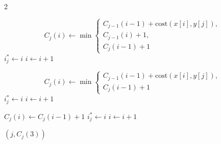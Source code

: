 \begin{multicols}{2}
\begin{algorithmic}
                \State
                \[
                    C_j(i)\gets
                    \min\left\{
                            \begin{array}{l}
                                C_{j-1}(i-1)+\mathrm{cost}(x[i],y[j]),\\
                                C_{j-1}(i)+ 1,\\
                                C_j(i-1)+ 1
                            \end{array}
                    \right.
                \]
                    \State $i_j^\ast \gets i$
                \EndIf
                \State $i \gets i+1$
            \EndWhile

                \State
                \[
                    C_j(i)\gets
                    \min\left\{
                            \begin{array}{l}
                                C_{j-1}(i-1)+\mathrm{cost}(x[i],y[j]),\\
                                C_j(i-1)+ 1
                            \end{array}
                    \right.
                \]
                    \State $i_j^\ast \gets i$
                \EndIf
                \State $i \gets i+1$

                    \State $C_j(i)\gets C_j(i-1)+ 1$
                        \State $i_j^\ast \gets i$
                    \EndIf
                    \State $i \gets i+1$
                \EndWhile
            \EndIf

                \State \Return $(j,C_j(3))$
            \EndIf
        \EndFor
    \end{algorithmic}
\end{multicols}

\newpage

